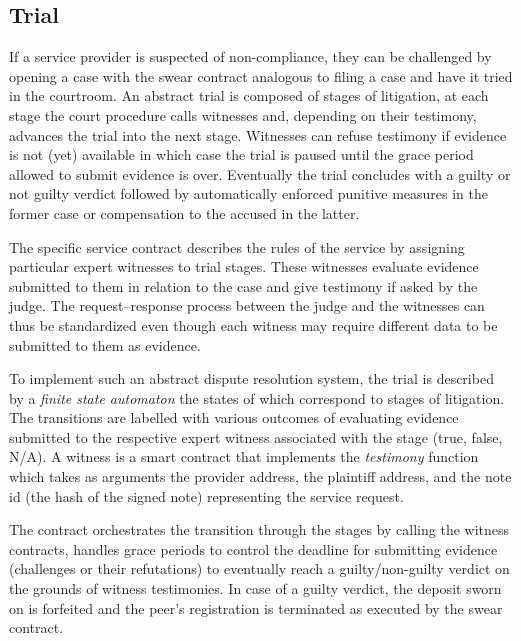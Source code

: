 \subsection{Trial}
\label{sec:swindle}

If a service provider is suspected of non-compliance, they can be challenged by opening a case with the swear contract analogous to filing a case and have it 
tried in the courtroom.
An abstract trial is composed of stages of litigation, at each stage the court procedure calls witnesses and, depending on their testimony, advances the trial into the next stage. Witnesses can refuse testimony if evidence is not (yet) available in which case the trial is paused until the grace period allowed to submit evidence is over. Eventually the trial concludes with a guilty or not guilty verdict followed by automatically enforced punitive measures in the former case or compensation to the accused in the latter.

The specific service contract describes the rules of the service by assigning particular expert witnesses to trial stages. These witnesses evaluate evidence submitted to them in relation to the case and give testimony if asked by the judge.
The request--response process between the judge and the witnesses can thus be standardized even though each witness may require different data to be submitted to them as evidence.

To implement such an abstract dispute resolution system, the trial is described by a \emph{finite state automaton} the states of which correspond to stages of litigation. The transitions are labelled with various outcomes of evaluating evidence submitted to the respective expert witness associated with the stage (true, false, N/A). A witness is a smart contract that implements the \emph{testimony} function which takes as arguments the provider address, the plaintiff address, and the note id (the hash of the signed note) representing the service request.

The  contract orchestrates the transition through the stages by calling the witness contracts, handles grace periods to control the deadline for submitting evidence (challenges or their refutations) to eventually reach a guilty/non-guilty verdict on the grounds of witness testimonies.
In case of a guilty verdict, the deposit sworn on is forfeited and the peer's registration is terminated as executed by the swear contract.

